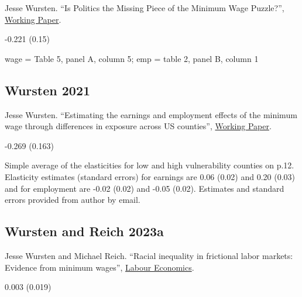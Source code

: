 \noindent Jesse Wursten. ``Is Politics the Missing Piece of the Minimum Wage Puzzle?'', \href{http://dx.doi.org/10.13140/RG.2.2.14177.20329}{Working Paper}.

\vspace{0.7em}

 -0.221 (0.15)

\vspace{0.7em}

 wage = Table 5, panel A, column 5; emp = table 2, panel B, column 1

\subsection*{Wursten 2021}
\vspace{-0.7em}

\noindent Jesse Wursten. ``Estimating the earnings and employment effects of the minimum wage through differences in exposure across US counties'', \href{https://www.dropbox.com/s/2f5j0mjyama8q0p/CAMWE_draft36.pdf?dl=0}{Working Paper}.

\vspace{0.7em}

 -0.269 (0.163)

\vspace{0.7em}

 Simple average of the elasticities for low and high vulnerability counties on p.12. Elasticity estimates (standard errors) for earnings are 0.06 (0.02) and 0.20 (0.03) and for employment are -0.02 (0.02) and -0.05 (0.02). Estimates and standard errors provided from author by email.

\subsection*{Wursten and Reich 2023a}
\vspace{-0.7em}

\noindent Jesse Wursten and Michael Reich. ``Racial inequality in frictional labor markets: Evidence from minimum wages'', \href{https://doi.org/10.1016/j.labeco.2023.102344}{Labour Economics}.

\vspace{0.7em}

 0.003 (0.019)

\vspace{0.7em}

